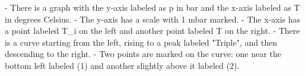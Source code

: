 - There is a graph with the y-axis labeled as p in bar and the x-axis labeled as T in degrees Celsius.
- The y-axis has a scale with 1 mbar marked.
- The x-axis has a point labeled T_i on the left and another point labeled T on the right.
- There is a curve starting from the left, rising to a peak labeled "Triple", and then descending to the right.
- Two points are marked on the curve: one near the bottom left labeled (1) and another slightly above it labeled (2).